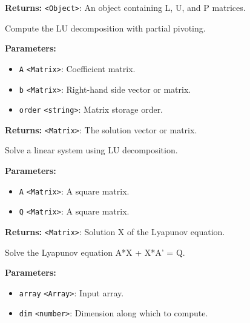 \documentclass[12pt,a4paper]{article}
\begin{document}
\noindent \textbf{Returns:} \texttt{<Object>}: An object containing L, U, and P matrices.

\noindent Compute the LU decomposition with partial pivoting.

\vspace{5mm}
\noindent {}


\noindent \textbf{Parameters:}
\begin{itemize}
  \item \texttt{A} \texttt{<Matrix>}: Coefficient matrix.
  \item \texttt{b} \texttt{<Matrix>}: Right-hand side vector or matrix.
  \item \texttt{order} \texttt{<string>}: Matrix storage order.
\end{itemize}

\noindent \textbf{Returns:} \texttt{<Matrix>}: The solution vector or matrix.

\noindent Solve a linear system using LU decomposition.

\vspace{5mm}
\noindent {}


\noindent \textbf{Parameters:}
\begin{itemize}
  \item \texttt{A} \texttt{<Matrix>}: A square matrix.
  \item \texttt{Q} \texttt{<Matrix>}: A square matrix.
\end{itemize}

\noindent \textbf{Returns:} \texttt{<Matrix>}: Solution X of the Lyapunov equation.

\noindent Solve the Lyapunov equation A*X + X*A' = Q.

\vspace{5mm}
\noindent {}


\noindent \textbf{Parameters:}
\begin{itemize}
  \item \texttt{array} \texttt{<Array>}: Input array.
  \item \texttt{dim} \texttt{<number>}: Dimension along which to compute.
\end{itemize}
\end{document}
